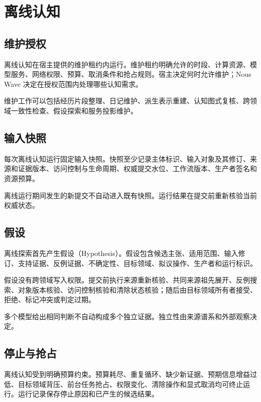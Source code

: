\chapter{离线认知}

\section{维护授权}

离线认知在宿主提供的维护租约内运行。维护租约明确允许的时段、计算资源、模型服务、网络权限、预算、取消条件和抢占规则。宿主决定何时允许维护；Nous Wave 决定在授权范围内处理哪些认知需求。

维护工作可以包括经历片段整理、日记维护、派生表示重建、认知图式复核、跨领域一致性检查、假设探索和服务投影维护。

\section{输入快照}

每次离线认知运行固定输入快照。快照至少记录主体标识、输入对象及其修订、来源和证据版本、访问控制与生命周期、权威提交水位、工作流版本、生产者签名和资源预算。

离线运行期间发生的新提交不自动进入既有快照。运行结果在提交前重新核验当前权威状态。

\section{假设}

离线探索首先产生假设（Hypothesis）。假设包含候选主张、适用范围、输入修订、支持证据、反例证据、不确定性、目标领域、拟议操作、生产者和运行标识。

假设没有跨领域写入权限。提交前执行来源重新核验、共同来源祖先展开、反例搜索、对象版本核验、访问控制核验和清除状态核验；随后由目标领域所有者接受、拒绝、标记冲突或判定过期。

多个模型给出相同判断不自动构成多个独立证据。独立性由来源谱系和外部观察决定。

\section{停止与抢占}

离线认知受到明确预算约束。预算耗尽、重复循环、缺少新证据、预期信息增益过低、目标领域背压、前台任务抢占、权限变化、清除操作和显式取消均可终止运行。运行记录保存停止原因和已产生的候选结果。
